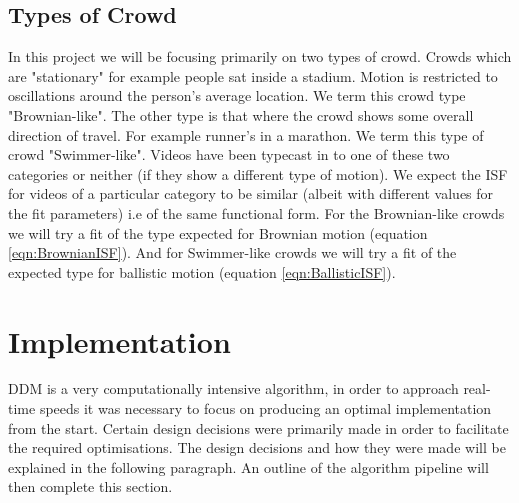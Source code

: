 \documentclass[11pt]{article}
\begin{document}
\subsection{Types of Crowd}
\label{section:crowdtypes}
In this project we will be focusing primarily on two types of crowd. Crowds which are "stationary" for example people sat inside a stadium. Motion is restricted to oscillations around the person's average location. We term this crowd type "Brownian-like". The other type is that where the crowd shows some overall direction of travel. For example runner's in a marathon. We term this type of crowd "Swimmer-like". Videos have been typecast in to one of these two categories or neither (if they show a different type of motion). We expect the ISF for videos of a particular category to be similar (albeit with different values for the fit parameters) i.e of the same functional form. For the Brownian-like crowds we will try a fit of the type expected for Brownian motion (equation \ref{eqn:BrownianISF}). And for Swimmer-like crowds we will try a fit of the expected type for ballistic motion (equation \ref{eqn:BallisticISF}).

\clearpage
\section{Implementation}

DDM is a very computationally intensive algorithm, in order to approach real-time speeds it was necessary to focus on producing an optimal implementation from the start. Certain design decisions were primarily made in order to facilitate the required optimisations. The design decisions and how they were made will be explained in the following paragraph. An outline of the algorithm pipeline will then complete this section.
\\\\
\end{document}
